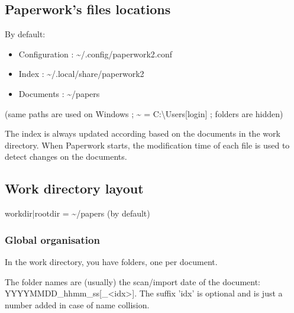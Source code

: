 \documentclass[10pt,a4paper]{article}
\begin{document}
\subsection{Paperwork's files locations}

By default:
\begin{itemize}
\item Configuration : \textasciitilde /.config/paperwork2.conf
\item Index : \textasciitilde /.local/share/paperwork2
\item Documents : \textasciitilde /papers
\end{itemize}
(same paths are used on Windows ; \textasciitilde{} = C:\textbackslash Users{[}login{]}
; folders are hidden)

The index is always updated according based on the documents in the
work directory. When Paperwork starts, the modification time of each
file is used to detect changes on the documents.

\subsection{Work directory layout}

workdir|rootdir = \textasciitilde /papers (by default)

\subsubsection{Global organisation}

In the work directory, you have folders, one per document.

The folder names are (usually) the scan/import date of the document:
YYYYMMDD\_hhmm\_ss{[}\_<idx>{]}. The suffix 'idx' is optional and
is just a number added in case of name collision.
\end{document}
